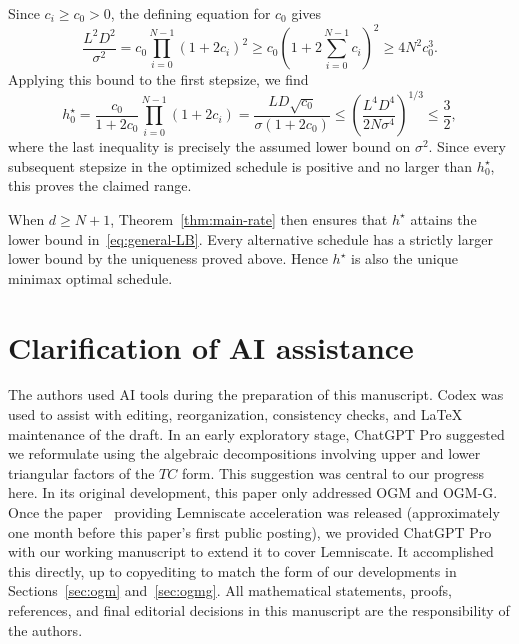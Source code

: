 \documentclass[11pt, hidelinks]{article}
\begin{document}
Since $c_i\geq c_0>0$, the defining equation for $c_0$ gives
\begin{equation*}
    \frac{L^2D^2}{\sigma^2}
    =c_0\prod_{i=0}^{N-1}(1+2c_i)^2
    \geq c_0\left(1+2\sum_{i=0}^{N-1}c_i\right)^2
    \geq4N^2c_0^3.
\end{equation*}
Applying this bound to the first stepsize, we find
\begin{equation*}
    h_0^\star
    =\frac{c_0}{1+2c_0}\prod_{i=0}^{N-1}(1+2c_i)
    =\frac{LD\sqrt{c_0}}{\sigma(1+2c_0)}
    \leq\left(\frac{L^4D^4}{2N\sigma^4}\right)^{1/3}
    \leq\frac32,
\end{equation*}
where the last inequality is precisely the assumed lower bound on $\sigma^2$.
Since every subsequent stepsize in the optimized schedule is positive and no larger than $h_0^\star$, this proves the claimed range.

When $d\geq N+1$, Theorem~\ref{thm:main-rate} then ensures that $h^\star$ attains the lower bound in~\eqref{eq:general-LB}.
Every alternative schedule has a strictly larger lower bound by the uniqueness proved above.
Hence $h^\star$ is also the unique minimax optimal schedule.



\section{Clarification of AI assistance}

The authors used AI tools during the preparation of this manuscript. Codex was used to assist with editing, reorganization, consistency checks, and \LaTeX{} maintenance of the draft. In an early exploratory stage, ChatGPT Pro suggested we reformulate using the algebraic decompositions involving upper and lower triangular factors of the $TC$ form. This suggestion was central to our progress here. In its original development, this paper only addressed OGM and OGM-G. Once the paper~\cite{KimRyuDasGupta26} providing Lemniscate acceleration was released (approximately one month before this paper's first public posting), we provided ChatGPT Pro with our working manuscript to extend it to cover Lemniscate. It accomplished this directly, up to copyediting to match the form of our developments in Sections~\ref{sec:ogm} and~\ref{sec:ogmg}.
All mathematical statements, proofs, references, and final editorial decisions in this manuscript are the responsibility of the authors.
\end{document}
